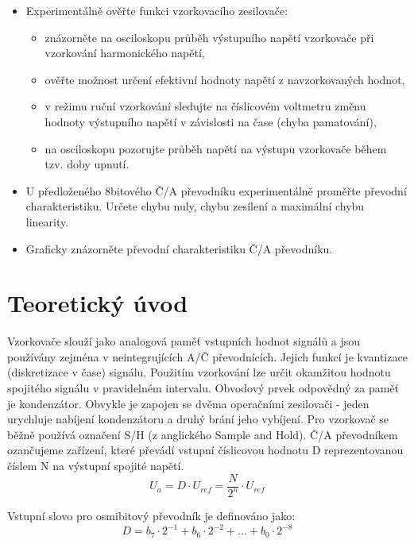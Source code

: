 \documentclass[a4paper, czech]{article}
\begin{document}
\begin{itemize}
    \item Experimentálně ověřte funkci vzorkovacího zesilovače:
    \begin{itemize}
        \item znázorněte na osciloskopu průběh výstupního napětí vzorkovače při vzorkování harmonického napětí,
        \item ověřte možnost určení efektivní hodnoty napětí z navzorkovaných hodnot,
        \item v režimu ruční vzorkování sledujte na číslicovém voltmetru změnu hodnoty výstupního napětí v závislosti na čase (chyba pamatování),
        \item na osciloskopu pozorujte průběh napětí na výstupu vzorkovače během tzv. doby upnutí.
    \end{itemize}
    \item U předloženého 8bitového Č/A převodníku experimentálně proměřte převodní charakteristiku. Určete chybu nuly, chybu zesílení a maximální chybu linearity.
    \item Graficky znázorněte převodní charakteristiku Č/A převodníku.
\end{itemize}

\section{Teoretický úvod}

Vzorkovače slouží jako analogová paměť vstupních hodnot signálů a jsou používány zejména v neintegrujících A/Č převodnících.
Jejich funkcí je kvantizace (diskretizace v čase) signálu.
Použitím vzorkování lze určit okamžitou hodnotu spojitého signálu v pravidelném intervalu.
Obvodový prvek odpovědný za paměť je kondenzátor.
Obvykle je zapojen se dvěma operačními zesilovači - jeden urychluje nabíjení kondenzátoru a druhý brání jeho vybíjení.
Pro vzorkovač se běžně používá označení S/H (z anglického Sample and Hold).
Č/A převodníkem ozančujeme zařízení, které převádí vstupní číslicovou hodnotu D reprezentovanou číslem N na výstupní spojité napětí.
\begin{equation*}
    U_a = D \cdot U_{ref} = \frac{N}{2^n} \cdot U_{ref}
\end{equation*}

Vstupní slovo pro osmibitový převodník je definováno jako:
\begin{equation*}
    D = b_7 \cdot 2^{-1} + b_6 \cdot 2^{-2} + ... + b_0 \cdot 2^{-8}
\end{equation*}
\end{document}
